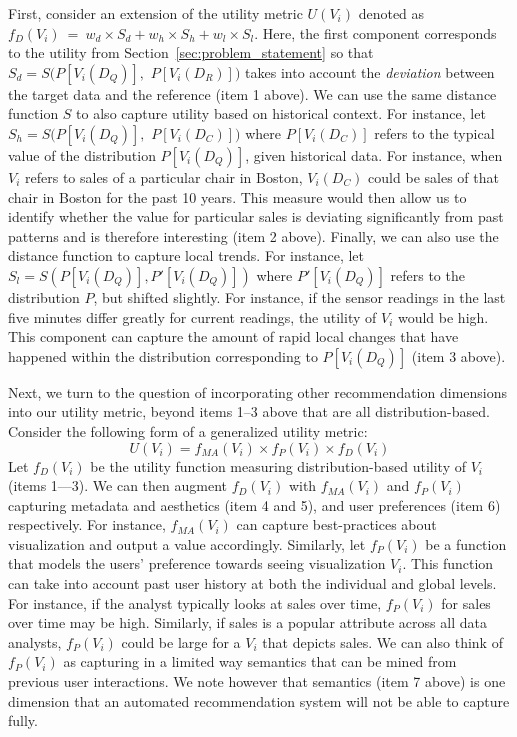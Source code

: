 {First, consider an extension of the utility metric  
$U (V_i)$ denoted as $f_D (V_i)\ =\ w_d \times S_d + w_h \times S_h + w_l  \times S_l$.
Here, the first component corresponds to the utility  
from Section~\ref{sec:problem_statement}
so that $S_d = S ( P[V_i (D_Q)],$ $P[V_i (D_R)] )$ 
takes into account the {\em deviation} between the target data and the reference (item 1 above).
We can use the same distance function $S$ to also capture utility based on historical context. 
For instance, let $S_h = S ( P[V_i (D_Q)], $ $P[V_i (D_C)] )$ where
$P[V_i (D_C)]$ refers to the typical value of the distribution 
$P[V_i (D_Q)]$, given historical data.
For instance, when $V_i$ refers to sales of a particular chair in 
Boston, $V_i(D_C)$ could be sales of that chair in Boston for the past 10 years.
This measure would then allow us to identify whether the value for particular sales is 
deviating significantly from past patterns and is therefore interesting (item 2 above).
Finally, we can also use the distance function to capture local trends.
For instance, let $S_l = S ( P[V_i (D_Q)], P'[V_i (D_Q)] )$ where
$P'[V_i (D_Q)]$ refers to the distribution $P$, but shifted slightly.
For instance, if the sensor readings in the last five minutes differ greatly
for current readings, the utility of $V_i$ would be high.
This component can capture
the amount of rapid local changes that have happened
within the distribution corresponding to $P[V_i (D_Q)]$ (item 3 above).


Next, we turn to the question of incorporating other recommendation dimensions into our utility 
metric, beyond items 1--3 above that are all distribution-based.
Consider the following form of a generalized utility metric:
$$ U (V_i) = f_{MA}(V_i) \times f_P (V_i) \times f_D (V_i)$$
Let $f_D (V_i)$ be the utility function measuring distribution-based utility of $V_i$ (items 1---3).
We can then augment $f_D (V_i)$ with $f_{MA}(V_i)$ and $f_P (V_i)$ capturing metadata  and aesthetics (item 4 and 5), and user preferences (item 6) respectively.
For instance, $f_{MA}(V_i)$ can capture best-practices about 
visualization and output a  value accordingly.
Similarly, let $f_P (V_i)$ be a function that models the users' preference towards seeing visualization $V_i$.
This function can take into account past user history at both the individual and global levels.
For instance, if the analyst typically looks at sales over time, $f_P (V_i)$ for sales over time
may be high.
Similarly, if sales is a popular attribute across all data analysts, $f_P (V_i)$ could be large for
a $V_i$ that depicts sales.
We can also think of $f_P (V_i)$ as capturing in a limited way semantics 
that can be mined from previous user interactions.
We note however that semantics (item 7 above) is one dimension that an automated 
recommendation system will not be able to capture fully.

}
